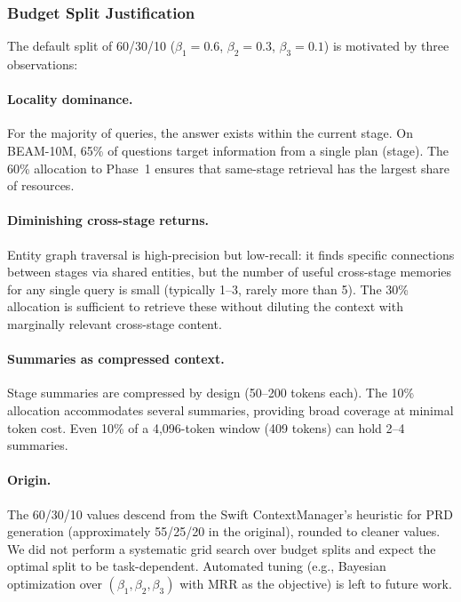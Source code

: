 \documentclass[11pt]{article}
\newcommand{\eg}{e.g.}
\begin{document}
\subsubsection{Budget Split Justification}
\label{sec:budget-split}

The default split of 60/30/10 ($\beta_1 = 0.6$, $\beta_2 = 0.3$,
$\beta_3 = 0.1$) is motivated by three observations:

\paragraph{Locality dominance.}
For the majority of queries, the answer exists within the current
stage.  On BEAM-10M, 65\% of questions target information from a
single plan (stage).  The 60\% allocation to Phase~1 ensures that
same-stage retrieval has the largest share of resources.

\paragraph{Diminishing cross-stage returns.}
Entity graph traversal is high-precision but low-recall: it finds
specific connections between stages via shared entities, but the
number of useful cross-stage memories for any single query is small
(typically 1--3, rarely more than 5).  The 30\% allocation is
sufficient to retrieve these without diluting the context with
marginally relevant cross-stage content.

\paragraph{Summaries as compressed context.}
Stage summaries are compressed by design (50--200 tokens each).  The
10\% allocation accommodates several summaries, providing broad
coverage at minimal token cost.  Even 10\% of a 4,096-token window
(409 tokens) can hold 2--4 summaries.

\paragraph{Origin.}
The 60/30/10 values descend from the Swift ContextManager's heuristic
for PRD generation (approximately 55/25/20 in the original), rounded
to cleaner values.  We did not perform a systematic grid search over
budget splits and expect the optimal split to be task-dependent.
Automated tuning (\eg, Bayesian optimization over
$(\beta_1, \beta_2, \beta_3)$ with MRR as the objective) is left to
future work.
\end{document}
